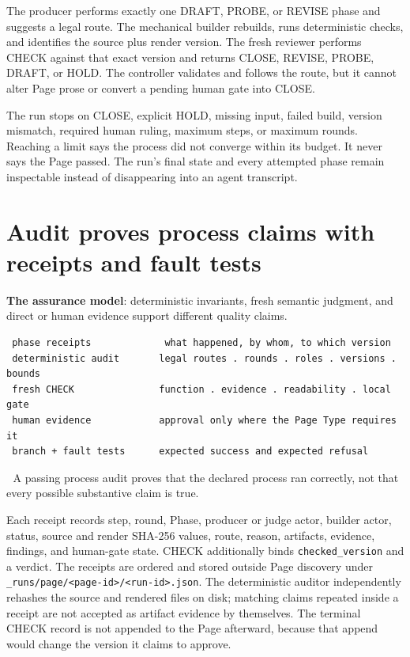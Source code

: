 The producer performs exactly one DRAFT, PROBE, or REVISE phase and suggests a legal route. The mechanical builder rebuilds, runs deterministic checks, and identifies the source plus render version. The fresh reviewer performs CHECK against that exact version and returns CLOSE, REVISE, PROBE, DRAFT, or HOLD. The controller validates and follows the route, but it cannot alter Page prose or convert a pending human gate into CLOSE.

The run stops on CLOSE, explicit HOLD, missing input, failed build, version mismatch, required human ruling, maximum steps, or maximum rounds. Reaching a limit says the process did not converge within its budget. It never says the Page passed. The run's final state and every attempted phase remain inspectable instead of disappearing into an agent transcript.


\section{Audit proves process claims with receipts and fault tests}
\textbf{The assurance model}: deterministic invariants, fresh semantic judgment, and direct or human evidence support different quality claims.

\begin{verbatim}
 phase receipts             what happened, by whom, to which version
 deterministic audit       legal routes . rounds . roles . versions . bounds
 fresh CHECK               function . evidence . readability . local gate
 human evidence            approval only where the Page Type requires it
 branch + fault tests      expected success and expected refusal
\end{verbatim}
📌 A passing process audit proves that the declared process ran correctly, not that every possible substantive claim is true.

Each receipt records step, round, Phase, producer or judge actor, builder actor, status, source and render SHA-256 values, route, reason, artifacts, evidence, findings, and human-gate state. CHECK additionally binds \texttt{checked\_version} and a verdict. The receipts are ordered and stored outside Page discovery under \texttt{\_runs/page/<page-id>/<run-id>.json}. The deterministic auditor independently rehashes the source and rendered files on disk; matching claims repeated inside a receipt are not accepted as artifact evidence by themselves. The terminal CHECK record is not appended to the Page afterward, because that append would change the version it claims to approve.

